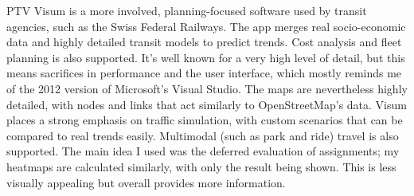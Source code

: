 PTV Visum is a more involved, planning-focused software used by transit agencies, such as the Swiss Federal Railways. The app merges real socio-economic data and highly detailed transit models to predict trends. Cost analysis and fleet planning is also supported. It's well known for a very high level of detail, but this means sacrifices in performance and the user interface, which mostly reminds me of the 2012 version of Microsoft's Visual Studio. The maps are nevertheless highly detailed, with nodes and links that act similarly to OpenStreetMap's data. Visum places a strong emphasis on traffic simulation, with custom scenarios that can be compared to real trends easily. Multimodal (such as park and ride) travel is also supported. The main idea I used was the deferred evaluation of assignments; my heatmaps are calculated similarly, with only the result being shown. This is less visually appealing but overall provides more information.